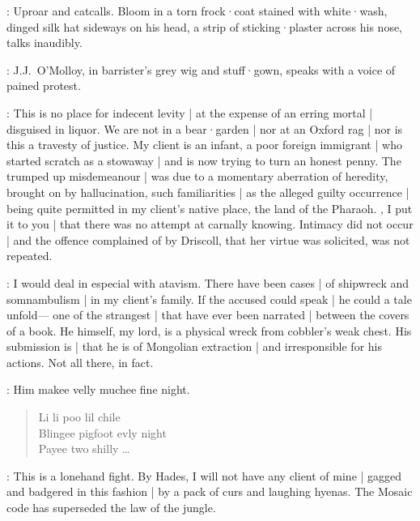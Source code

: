 :
Uproar and catcalls.
Bloom in a torn frock·coat stained with white·wash,
dinged silk hat sideways on his head,
a strip of sticking·plaster across his nose,
talks inaudibly.

:
J.J.~O'Molloy,
in barrister's grey wig and stuff·gown,
speaks with a voice of pained protest.

\JJOM:
This is no place for indecent levity |
at the expense of an erring mortal |
disguised in liquor.
We are not in a bear·garden |
nor at an Oxford rag |
nor is this a travesty of justice.
My client is an infant,
a poor foreign immigrant |
who started scratch as a stowaway |
and is now trying to turn an honest penny.
The trumped up misdemeanour |
was due to a momentary aberration of heredity,
brought on by hallucination,
such familiarities |
as the alleged guilty occurrence |
being quite permitted in my client's native place,
the land of the Pharaoh.
,
I put it to you |
that there was no attempt at carnally knowing.
Intimacy did not occur |
and the offence complained of by Driscoll,
that her virtue was solicited,
was not repeated.


\begin{omitted}
\JJOM:
I would deal in especial with atavism.
There have been cases |
of shipwreck and somnambulism |
in my client's family.
If the accused could speak |
he could a tale unfold---%
one of the strangest |
that have ever been narrated |
between the covers of a book.
He himself,
my lord,
is a physical wreck from cobbler's weak chest.
His submission is |
that he is of Mongolian extraction |
and irresponsible for his actions.
Not all there,
in fact.

\Bloom:
Him makee velly muchee fine night.
\begin{verse}
    Li li poo lil chile\\
    Blingee pigfoot evly night\\
    Payee two shilly \ldots
\end{verse}


\JJOM:
This is a lonehand fight.
By Hades,
I will not have any client of mine |
gagged and badgered in this fashion |
by a pack of curs and laughing hyenas.
The Mosaic code has superseded the law of the jungle.
\end{omitted}

